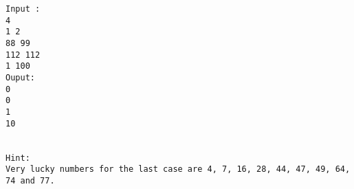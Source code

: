 \begin{verbatim}
Input :
4 
1 2 
88 99 
112 112 
1 100 
Ouput: 
0 
0 
1 
10 

 
Hint: 
Very lucky numbers for the last case are 4, 7, 16, 28, 44, 47, 49, 64, 74 and 77. 
\end{verbatim}